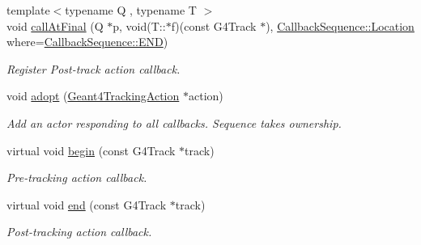 \begin{DoxyCompactItemize}
{\footnotesize template$<$typename Q , typename T $>$ }\\void \hyperlink{class_d_d4hep_1_1_simulation_1_1_geant4_tracking_action_sequence_a79391a6f41fad96a2b7af4e74b6b72a3}{call\+At\+Final} (Q $\ast$p, void(T\+::$\ast$f)(const G4\+Track $\ast$), \hyperlink{struct_d_d4hep_1_1_callback_sequence_a7753490247479633aed16a2376821ef7}{Callback\+Sequence\+::\+Location} where=\hyperlink{struct_d_d4hep_1_1_callback_sequence_a7753490247479633aed16a2376821ef7ac39eeb1bcfc1c235ab1d0d9315c310ac}{Callback\+Sequence\+::\+E\+ND})
\begin{DoxyCompactList}\small\item\em Register Post-\/track action callback. \end{DoxyCompactList}\item 
void \hyperlink{class_d_d4hep_1_1_simulation_1_1_geant4_tracking_action_sequence_a6de81eaad737a180e602a8a826bfa06e}{adopt} (\hyperlink{class_d_d4hep_1_1_simulation_1_1_geant4_tracking_action}{Geant4\+Tracking\+Action} $\ast$action)
\begin{DoxyCompactList}\small\item\em Add an actor responding to all callbacks. Sequence takes ownership. \end{DoxyCompactList}\item 
virtual void \hyperlink{class_d_d4hep_1_1_simulation_1_1_geant4_tracking_action_sequence_a21df8be5f0514bb4295fc2de9afe4eb2}{begin} (const G4\+Track $\ast$track)
\begin{DoxyCompactList}\small\item\em Pre-\/tracking action callback. \end{DoxyCompactList}\item 
virtual void \hyperlink{class_d_d4hep_1_1_simulation_1_1_geant4_tracking_action_sequence_aeed70df4aa406595a03464436c52dce0}{end} (const G4\+Track $\ast$track)
\begin{DoxyCompactList}\small\item\em Post-\/tracking action callback. \end{DoxyCompactList}\end{DoxyCompactItemize}
